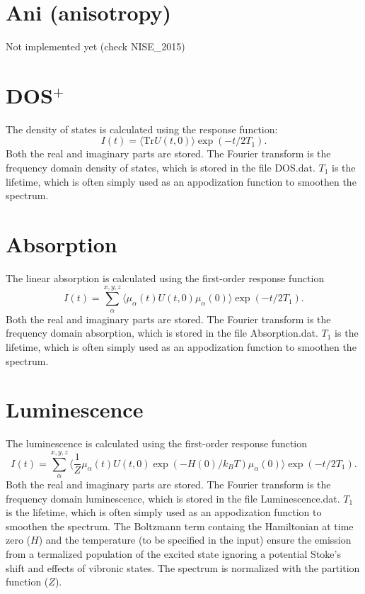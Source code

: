 \section{Ani (anisotropy)}
Not implemented yet (check NISE\_2015)
\section{DOS$^{+}$}
The density of states is calculated using the response function:
\begin{equation}
	I(t)=\langle\textrm{Tr}U(t,0)\rangle\exp(-t/2T_1).
\end{equation}
Both the real and imaginary parts are stored. The Fourier transform is the frequency domain density of states, which is stored in the file DOS.dat. $T_1$ is the lifetime, which is often simply used as an appodization function to smoothen the spectrum.
\section{Absorption}
The linear absorption is calculated using the first-order response function \cite{Duan_2015}
\begin{equation}
	I(t)=\sum_{\alpha}^{x,y,z}\langle\mu_{\alpha}(t)U(t,0)\mu_{\alpha}(0)\rangle\exp(-t/2T_1).
\end{equation}
Both the real and imaginary parts are stored. The Fourier transform is the frequency domain absorption, which is stored in the file Absorption.dat. $T_1$ is the lifetime, which is often simply used as an appodization function to smoothen the spectrum. 
\section{Luminescence}
The luminescence is calculated using the first-order response function
\begin{equation}
	I(t)=\sum_{\alpha}^{x,y,z}\langle\frac{1}{Z}\mu_{\alpha}(t)U(t,0)\exp(-H(0)/k_BT)\mu_{\alpha}(0)\rangle\exp(-t/2T_1).
\end{equation}
Both the real and imaginary parts are stored. The Fourier transform is the frequency domain luminescence, which is stored in the file Luminescence.dat. $T_1$ is the lifetime, which is often simply used as an appodization function to smoothen the spectrum. The Boltzmann term containg the Hamiltonian at time zero ($H$) and the temperature (to be specified in the input) ensure the emission from a termalized population of the excited state ignoring a potential Stoke's shift and effects of vibronic states. The spectrum is normalized with the partition function ($Z$). 
